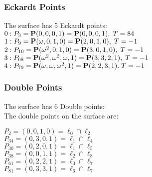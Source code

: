 \documentclass{article}
\newcommand{\bP}{{\bf P}}
\begin{document}
{\subsubsection*{Eckardt Points}
The surface has 5 Eckardt points:\\
$0 : P_{3}=\bP(0, 0, 0, 1) = \bP(0, 0, 0, 1),\; T= 84$\\
$1 : P_{9}=\bP(\omega , 0, 1, 0) = \bP(2, 0, 1, 0),\; T= -1$\\
$2 : P_{10}=\bP(\omega^{2}, 0, 1, 0) = \bP(3, 0, 1, 0),\; T= -1$\\
$3 : P_{68}=\bP(\omega^{2}, \omega^{2}, \omega , 1) = \bP(3, 3, 2, 1),\; T= -1$\\
$4 : P_{79}=\bP(\omega , \omega , \omega^{2}, 1) = \bP(2, 2, 3, 1).\; T= -1$\\
\subsubsection*{Double Points}
The surface has 6 Double points:\\
The double points on the surface are:\\
\begin{multicols}{2}
\noindent
$P_{2} = ( 0, 0, 1, 0 ) = \ell_{0} \cap \ell_{2} $\\
$P_{34} = ( 0, 3, 0, 1 ) = \ell_{1} \cap \ell_{4} $\\
$P_{30} = ( 0, 2, 0, 1 ) = \ell_{1} \cap \ell_{5} $\\
$P_{38} = ( 0, 0, 1, 1 ) = \ell_{2} \cap \ell_{8} $\\
$P_{61} = ( 0, 2, 2, 1 ) = \ell_{3} \cap \ell_{7} $\\
$P_{81} = ( 0, 3, 3, 1 ) = \ell_{6} \cap \ell_{7} $\\
\end{multicols}
}
\end{document}
